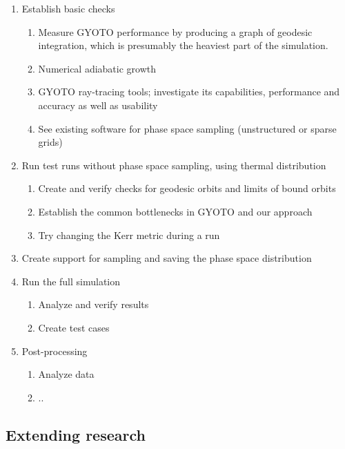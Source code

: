 \documentclass[12pt]{article}
\begin{document}
\begin{enumerate}
 \item Establish basic checks
 \begin{enumerate}
  \item Measure GYOTO performance by producing a graph of geodesic integration, which is presumably the heaviest part of the simulation.
  \item Numerical adiabatic growth \citep{Sadeghian_Ferrer_Will_2013}
  \item GYOTO ray-tracing tools; investigate its capabilities, performance and accuracy as well as usability
  \item See existing software for phase space sampling (unstructured or sparse grids)
 \end{enumerate}
 \item Run test runs without phase space sampling, using thermal distribution
 \begin{enumerate}
  \item Create and verify checks for geodesic orbits and limits of bound orbits
  \item Establish the common bottlenecks in GYOTO and our approach
  \item Try changing the Kerr metric during a run
 \end{enumerate}
 \item Create support for sampling and saving the phase space distribution
 \item Run the full simulation
 \begin{enumerate}
  \item Analyze and verify results
  \item Create test cases
 \end{enumerate}
 \item Post-processing
 \begin{enumerate}
  \item Analyze data
  \item ..
 \end{enumerate}
\end{enumerate}


\subsection{Extending research}

\end{document}
